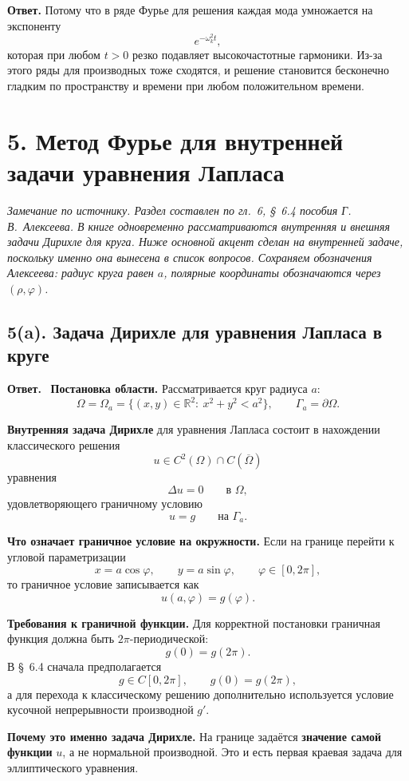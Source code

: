 \documentclass[a4paper,12pt]{article}
\newcommand{\Answer}{\textbf{Ответ.}\ }
\begin{document}
\textbf{Ответ.}
Потому что в ряде Фурье для решения каждая мода умножается на экспоненту
\[
e^{-\omega_k^2t},
\]
которая при любом $t>0$ резко подавляет высокочастотные гармоники. Из-за этого ряды для производных тоже сходятся, и решение становится бесконечно гладким по пространству и времени при любом положительном времени.

\section*{5. Метод Фурье для внутренней задачи уравнения Лапласа}

\textit{Замечание по источнику. Раздел составлен по гл.~6, \S~6.4 пособия Г.\,В.~Алексеева. В книге одновременно рассматриваются внутренняя и внешняя задачи Дирихле для круга. Ниже основной акцент сделан на внутренней задаче, поскольку именно она вынесена в список вопросов. Сохраняем обозначения Алексеева: радиус круга равен $a$, полярные координаты обозначаются через $(\rho,\varphi)$.}

\subsection*{5(a). Задача Дирихле для уравнения Лапласа в круге}

\Answer
\textbf{Постановка области.}
Рассматривается круг радиуса $a$:
\[
\Omega=\Omega_a=\{(x,y)\in\mathbb{R}^2:\ x^2+y^2<a^2\},
\qquad
\Gamma_a=\partial\Omega.
\]

\textbf{Внутренняя задача Дирихле} для уравнения Лапласа состоит в нахождении классического решения
\[
u\in C^2(\Omega)\cap C(\overline\Omega)
\]
уравнения
\[
\Delta u=0
\qquad \text{в } \Omega,
\]
удовлетворяющего граничному условию
\[
u=g
\qquad \text{на } \Gamma_a.
\]

\textbf{Что означает граничное условие на окружности.}
Если на границе перейти к угловой параметризации
\[
x=a\cos\varphi,
\qquad
y=a\sin\varphi,
\qquad
\varphi\in[0,2\pi],
\]
то граничное условие записывается как
\[
u(a,\varphi)=g(\varphi).
\]

\textbf{Требования к граничной функции.}
Для корректной постановки граничная функция должна быть $2\pi$-периодической:
\[
g(0)=g(2\pi).
\]
В \S~6.4 сначала предполагается
\[
g\in C[0,2\pi],
\qquad
g(0)=g(2\pi),
\]
а для перехода к классическому решению дополнительно используется условие кусочной непрерывности производной $g'$.

\textbf{Почему это именно задача Дирихле.}
На границе задаётся \textbf{значение самой функции} $u$, а не нормальной производной. Это и есть первая краевая задача для эллиптического уравнения.
\end{document}
